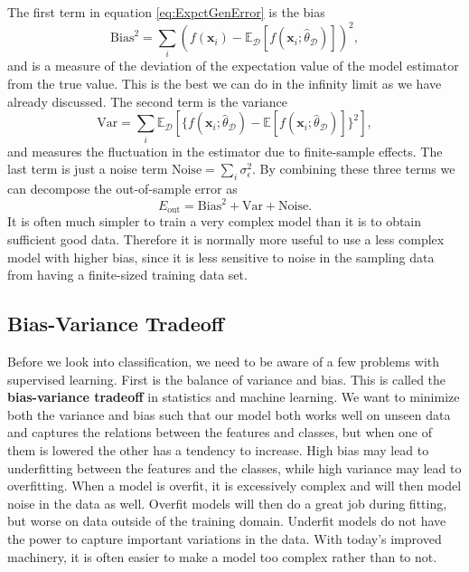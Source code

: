 \documentclass[a4paper, american, 12pt]{report}
\begin{document}
	The first term in equation \ref{eq:ExpctGenError} is the bias
	\begin{equation}
	\label{eq:Bias}
		\text{Bias}^2=\sum_i (f(\textbf{x}_i)-\mathds{E}_{\mathcal{D}}[f(\textbf{x}_i;\hat{\theta}_{\mathcal{D}})])^2,
	\end{equation}
	and is a measure of the deviation of the expectation value of the model estimator from the true value. This is the best we can do in the infinity limit as we have already discussed. The second term is the variance 
	\begin{equation}
	\label{eq:Variance}
		\text{Var}= \sum_i \mathds{E}_{\mathcal{D}}[\{f(\textbf{x}_i;\hat{\theta}_{\mathcal{D}})-\mathds{E}[f(\textbf{x}_i;\hat{\theta}_{\mathcal{D}})]\}^2], 
	\end{equation}
	and measures the fluctuation in the estimator due to finite-sample effects. The last term is just a noise term $\text{Noise}=\sum_{i}\sigma_{\epsilon}^2$. By combining these three terms we can decompose the out-of-sample error as
	\begin{equation}
	\label{eq:OutOfSampleError}
		E_{\text{out}}=\text{Bias}^2+\text{Var}+\text{Noise}.
	\end{equation}
	It is often much simpler to train a very complex model than it is to obtain sufficient good data. Therefore it is normally more useful to use a less complex model with higher bias, since it is less sensitive to noise in the sampling data from having a finite-sized training data set.
	
	
	\subsection{Bias-Variance Tradeoff}
	\label{subsect:Theory-BiasVarianceTradeoff}
	Before we look into classification, we need to be aware of a few problems with supervised learning. First is the balance of variance and bias. This is called the \textbf{bias-variance tradeoff} in statistics and machine learning. We want to minimize both the variance and bias such that our model both works well on unseen data and captures the relations between the features and classes, but when one of them is lowered the other has a tendency to increase. High bias may lead to underfitting between the features and the classes, while high variance may lead to overfitting. When a model is overfit, it is excessively complex and will then model noise in the data as well. Overfit models will then do a great job during fitting, but worse on data outside of the training domain. Underfit models do not have the power to capture important variations in the data. With today's improved machinery, it is often easier to make a model too complex rather than to not.
	
\end{document}
